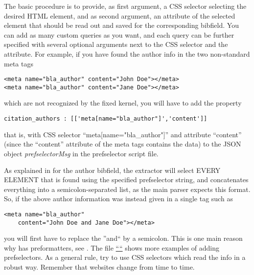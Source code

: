 \documentclass[
a4paper,
12pt,
]
{article}
\begin{document}
The basic procedure is to provide, as first argument, a CSS selector selecting the desired HTML element, and as second argument, an attribute of the selected element that should be read out and saved for the corresponding bibfield. You can add as many custom queries as you want, and each query can be further specified with several optional arguments next to the CSS selector and the attribute. For example, if you have found the author info in the two non-standard meta tags
\begin{center}
\begin{lstlisting}
<meta name="bla_author" content="John Doe"></meta>
<meta name="bla_author" content="Jane Doe"></meta>
\end{lstlisting}
\end{center}
which are not recognized by the fixed kernel, you will have to add the property
\begin{center}
\begin{lstlisting}
citation_authors : [['meta[name="bla_author"]','content']]
\end{lstlisting}
\end{center}
that is, with CSS selector ``meta[name="bla\_author"]'' and attribute ``content'' (since the ``content'' attribute of the meta tags contains the data) to the JSON object \textit{prefselectorMsg} in the prefselector script file.\par
As explained in  for the author bibfield, the extractor will select EVERY ELEMENT that is found using the specified prefselector string, and concatenates everything into a semicolon-separated list, as the main parser expects this format. So, if the above author information was instead given in a single tag such as
\begin{center}
\begin{lstlisting}
<meta name="bla_author" 
	content="John Doe and Jane Doe"></meta>
\end{lstlisting}
\end{center}
you will first have to replace the ''and`` by a semicolon. This is one main reason why {\plgname} has preformatters, see .
The file \href{https://github.com/Langenscheiss/bibitnow/blob/master/extractors/prefselectors/0_EXAMPLE.js}{``\exmpl``} shows more examples of adding prefselectors. As a general rule, try to use CSS selectors which read the info in a robust way. Remember that websites change from time to time.
\end{document}
